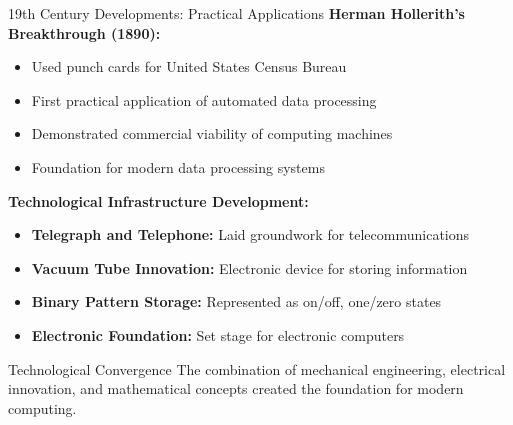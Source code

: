 \documentclass[aspectratio=169]{beamer}
\begin{document}
\begin{frame}{19th Century Developments: Practical Applications}
    \textbf{Herman Hollerith's Breakthrough (1890):}
    \begin{itemize}
        \item Used punch cards for United States Census Bureau
        \item First practical application of automated data processing
        \item Demonstrated commercial viability of computing machines
        \item Foundation for modern data processing systems
    \end{itemize}
    
    \vspace{0.5cm}
    \textbf{Technological Infrastructure Development:}
    \begin{itemize}
        \item \textbf{Telegraph and Telephone:} Laid groundwork for telecommunications
        \item \textbf{Vacuum Tube Innovation:} Electronic device for storing information
        \item \textbf{Binary Pattern Storage:} Represented as on/off, one/zero states
        \item \textbf{Electronic Foundation:} Set stage for electronic computers
    \end{itemize}
    
    \vspace{0.3cm}
    \begin{exampleblock}{Technological Convergence}
        The combination of mechanical engineering, electrical innovation, and mathematical concepts created the foundation for modern computing.
    \end{exampleblock}
\end{frame}
\end{document}
